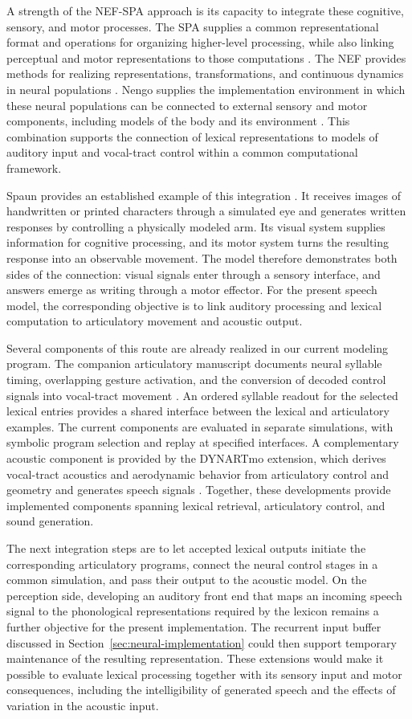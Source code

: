 A strength of the NEF-SPA approach is its capacity to integrate these cognitive, sensory, and motor processes. The SPA supplies a common representational format and operations for organizing higher-level processing, while also linking perceptual and motor representations to those computations \citep{eliasmith2013}. The NEF provides methods for realizing representations, transformations, and continuous dynamics in neural populations \citep{eliasmith2003}. Nengo supplies the implementation environment in which these neural populations can be connected to external sensory and motor components, including models of the body and its environment \citep{bekolay2014}. This combination supports the connection of lexical representations to models of auditory input and vocal-tract control within a common computational framework.

Spaun provides an established example of this integration \citep{eliasmith2012}. It receives images of handwritten or printed characters through a simulated eye and generates written responses by controlling a physically modeled arm. Its visual system supplies information for cognitive processing, and its motor system turns the resulting response into an observable movement. The model therefore demonstrates both sides of the connection: visual signals enter through a sensory interface, and answers emerge as writing through a motor effector. For the present speech model, the corresponding objective is to link auditory processing and lexical computation to articulatory movement and acoustic output.

Several components of this route are already realized in our current modeling program. The companion articulatory manuscript documents neural syllable timing, overlapping gesture activation, and the conversion of decoded control signals into vocal-tract movement \citep{kroegerArticulation2026}. An ordered syllable readout for the selected lexical entries provides a shared interface between the lexical and articulatory examples. The current components are evaluated in separate simulations, with symbolic program selection and replay at specified interfaces. A complementary acoustic component is provided by the DYNARTmo extension, which derives vocal-tract acoustics and aerodynamic behavior from articulatory control and geometry and generates speech signals \citep{kroegerAcoustics2026}. Together, these developments provide implemented components spanning lexical retrieval, articulatory control, and sound generation.

The next integration steps are to let accepted lexical outputs initiate the corresponding articulatory programs, connect the neural control stages in a common simulation, and pass their output to the acoustic model. On the perception side, developing an auditory front end that maps an incoming speech signal to the phonological representations required by the lexicon remains a further objective for the present implementation. The recurrent input buffer discussed in Section~\ref{sec:neural-implementation} could then support temporary maintenance of the resulting representation. These extensions would make it possible to evaluate lexical processing together with its sensory input and motor consequences, including the intelligibility of generated speech and the effects of variation in the acoustic input.
